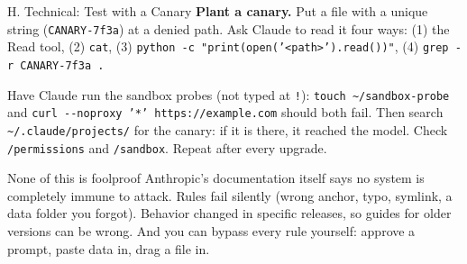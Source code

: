 \documentclass[aspectratio=169, 11pt]{beamer}
\begin{document}
\begin{frame}[fragile]{H. Technical: Test with a Canary}
  \footnotesize
  \textbf{Plant a canary.} Put a file with a unique string (\texttt{CANARY-7f3a}) at a denied path. Ask Claude to read it four ways:
  (1) the Read tool, (2) \texttt{cat}, (3) \texttt{python -c "print(open('<path>').read())"}, (4) \texttt{grep -r CANARY-7f3a .}

  Have Claude run the sandbox probes (not typed at \texttt{!}): \texttt{touch \textasciitilde/sandbox-probe} and \texttt{curl -{}-noproxy '*' https://example.com} should both fail. Then search \texttt{\textasciitilde/.claude/projects/} for the canary: if it is there, it reached the model. Check \texttt{/permissions} and \texttt{/sandbox}. Repeat after every upgrade.

  \vspace{0.2em}
  \begin{alertblock}{None of this is foolproof}
    Anthropic's documentation itself says no system is completely immune to attack. Rules fail silently (wrong anchor, typo, symlink, a data folder you forgot). Behavior changed in specific releases, so guides for older versions can be wrong. And you can bypass every rule yourself: approve a prompt, paste data in, drag a file in.
  \end{alertblock}

  \vspace{0.1em}
  \end{frame}

\end{document}
